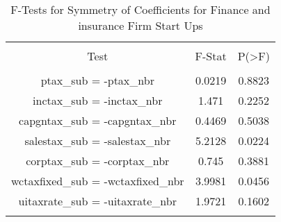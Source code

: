 
\begin{table}[!htbp] \centering 
  \caption{F-Tests for Symmetry of Coefficients for Finance and insurance Firm Start Ups} 
  \label{52Ftests} 
\begin{tabular}{@{\extracolsep{5pt}} ccc} 
\\[-1.8ex]\hline 
\hline \\[-1.8ex] 
Test & F-Stat & P(\textgreater F) \\ 
\hline \\[-1.8ex] 
ptax\_sub = -ptax\_nbr & 0.0219 & 0.8823 \\ 
inctax\_sub = -inctax\_nbr & 1.471 & 0.2252 \\ 
capgntax\_sub = -capgntax\_nbr & 0.4469 & 0.5038 \\ 
salestax\_sub = -salestax\_nbr & 5.2128 & 0.0224 \\ 
corptax\_sub = -corptax\_nbr & 0.745 & 0.3881 \\ 
wctaxfixed\_sub = -wctaxfixed\_nbr & 3.9981 & 0.0456 \\ 
uitaxrate\_sub = -uitaxrate\_nbr & 1.9721 & 0.1602 \\ 
\hline \\[-1.8ex] 
\end{tabular} 
\end{table} 
